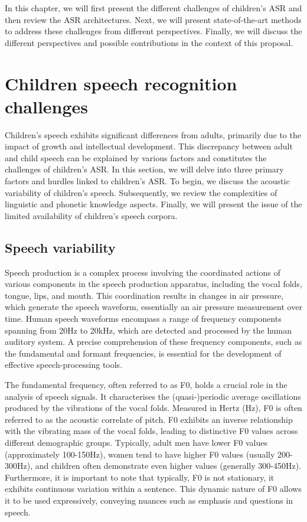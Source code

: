In this chapter, we will first present the different challenges of children's ASR and then review the ASR architectures. Next, we will present state-of-the-art methods to address these challenges from different perspectives. Finally, we will discuss the different perspectives and possible contributions in the context of this proposal. 
\section{Children speech  recognition challenges}%
\label{section:Children_seepch_challenges}
Children's speech exhibits significant differences from adults, primarily due to the impact of growth and intellectual development. This discrepancy between adult and child speech can be explained by various factors and constitutes the challenges of children's ASR. In this section, we will delve into three primary factors and hurdles linked to children's ASR. To begin, we discuss the acoustic variability of children's speech. Subsequently, we review the complexities of linguistic and phonetic knowledge aspects. Finally, we will present the issue of the limited availability of children's speech corpora.
\subsection{Speech variability}%
Speech production is a complex process involving the coordinated actions of various components in the speech production apparatus, including the vocal folds, tongue, lips, and mouth. This coordination results in changes in air pressure, which generate the speech waveform, essentially an air pressure measurement over time. Human speech waveforms encompass a range of frequency components spanning from 20Hz to 20kHz, which are detected and processed by the human auditory system. A precise comprehension of these frequency components, such as the fundamental and formant frequencies, is essential for the development of effective speech-processing tools.

The fundamental frequency, often referred to as F0, holds a crucial role in the analysis of speech signals. It characterises the (quasi-)periodic average oscillations produced by the vibrations of the vocal folds. Measured in Hertz (Hz), F0 is often referred to as the acoustic correlate of pitch. F0 exhibits an inverse relationship with the vibrating mass of the vocal folds, leading to distinctive F0 values across different demographic groups. Typically, adult men have lower F0 values (approximately 100-150Hz), women tend to have higher F0 values (usually 200-300Hz), and children often demonstrate even higher values (generally 300-450Hz). Furthermore, it is important to note that typically, F0 is not stationary, it exhibits continuous variation within a sentence. This dynamic nature of F0 allows it to be used expressively, conveying nuances such as emphasis and questions in speech.

